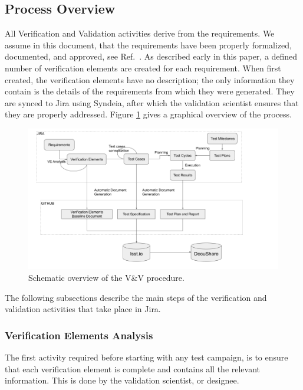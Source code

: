 \subsection{Process Overview}\label{sec:proc}

All Verification and Validation activities derive from the requirements.
We assume in this document, that the requirements have been properly formalized, documented, and approved, 
see Ref.~.
As described early in this paper, a defined number of verification elements are created for each requirement.
When first created, the verification elements have no description;
the only information they contain is the details of the requirements from which they were generated.
They are synced to Jira using Syndeia, after which the validation scientist ensures that they are properly addressed.
Figure  \ref{fig:vandvproc} gives a graphical overview of the process.

\begin{figure}
\begin{center}
\includegraphics[width=\textwidth]{imgs/VandVprocedure.png}
 \caption{Schematic overview of the V\&V procedure.}
 \label{fig:vandvproc}
\end{center}
\end{figure}

The following subsections describe the main steps of the verification and validation activities that take place in Jira.


\subsubsection{Verification Elements Analysis}

The first activity required before starting with any test campaign, is to ensure that each verification element 
is complete and contains all the relevant information.
This is done by the validation scientist, or designee.

